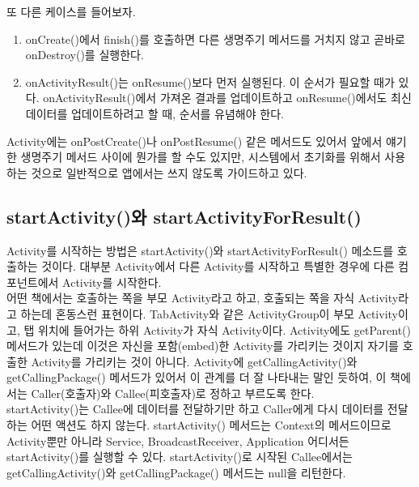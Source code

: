 또 다른 케이스를 들어보자.
\begin{enumerate}
\item onCreate()에서 finish()를 호출하면 다른 생명주기 메서드를 거치지 않고 곧바로 onDestroy()를 실행한다.
\item onActivityResult()는 onResume()보다 먼저 실행된다.
이 순서가 필요할 때가 있다. onActivityResult()에서 가져온 결과를 업데이트하고
onResume()에서도 최신 데이터를 업데이트하려고 할 때, 순서를 유념해야 한다.
\end{enumerate}

Activity에는 onPostCreate()나 onPostResume() 같은 메서드도 있어서 앞에서 얘기한 생명주기 메서드 사이에 뭔가를 할 수도 있지만, 시스템에서 초기화를 위해서 사용하는 것으로 일반적으로 앱에서는 쓰지 않도록 가이드하고 있다.

\subsection{startActivity()와 startActivityForResult()}
Activity를 시작하는 방법은 startActivity()와 startActivityForResult() 메소드를 호출하는 것이다. 대부분 Activity에서 다른 Activity를 시작하고 특별한 경우에 다른 컴포넌트에서 Activity를 시작한다.\\

어떤 책에서는 호출하는 쪽을 부모 Activity라고 하고, 호출되는 쪽을 자식 Activity라고 하는데 혼동스런 표현이다. TabActivity와 같은 ActivityGroup이 부모 Activity이고, 탭 위치에 들어가는 하위 Activity가 자식 Activity이다. Activity에도 getParent() 메서드가 있는데 이것은 자신을 포함(embed)한 Activity를 가리키는 것이지 자기를 호출한 Activity를 가리키는 것이 아니다. 
Activity에 getCallingActivity()와 getCallingPackage() 메서드가 있어서 이 관계를 더 잘 나타내는 말인 듯하여, 이 책에서는 Caller(호출자)와 Callee(피호출자)로 정하고 부르도록 한다.\\

startActivity()는 Callee에 데이터를 전달하기만 하고 Caller에게 다시 데이터를 전달하는 어떤 액션도 하지 않는다.
startActivity() 메서드는 Context의 메서드이므로 Activity뿐만 아니라 Service, BroadcastReceiver, Application 어디서든 startActivity()를 실행할 수 있다.
startActivity()로 시작된 Callee에서는 getCallingActivity()와 getCallingPackage() 메서드는 null을 리턴한다.

